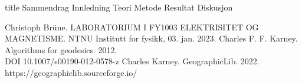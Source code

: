 \documentclass[5p]{article}
\begin{document}
{title} %
{Sammendrag}
\pagebreak
{Innledning}
{Teori}
{Metode}
{Resultat}
{Diskusjon}

\begin{thebibliography}{5}
Christoph Brüne. LABORATORIUM I FY1003 ELEKTRISITET OG MAGNETISME. NTNU Institutt for fysikk, 03. jan. 2023.
 Charles F. F. Karney. Algorithms for geodesics. 2012.
\\ DOI 10.1007/s00190-012-0578-z
 Charles Karney. GeographicLib. 2022.
https://geographiclib.sourceforge.io/
\end{thebibliography}
\end{document}
